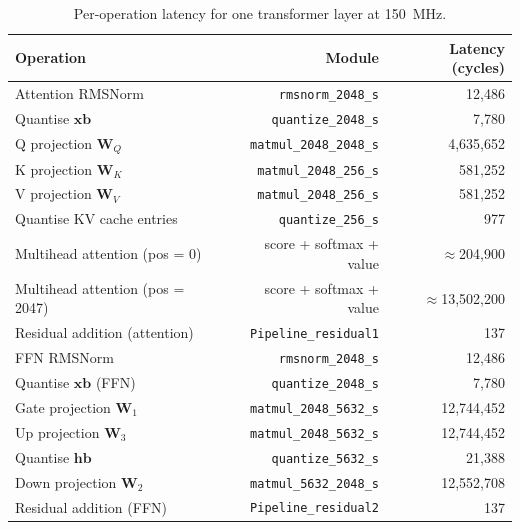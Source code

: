 \begin{table}[H]
  \centering
  \begin{tabular}{lrr}
    \toprule
    Operation & Module & Latency (cycles) \\
    \midrule
    Attention RMSNorm              & \texttt{rmsnorm\_2048\_s}      &      12{,}486 \\
    Quantise $\mathbf{xb}$         & \texttt{quantize\_2048\_s}     &       7{,}780 \\
    Q projection $\mathbf{W}_Q$    & \texttt{matmul\_2048\_2048\_s} &   4{,}635{,}652 \\
    K projection $\mathbf{W}_K$    & \texttt{matmul\_2048\_256\_s}  &     581{,}252 \\
    V projection $\mathbf{W}_V$    & \texttt{matmul\_2048\_256\_s}  &     581{,}252 \\
    Quantise KV cache entries      & \texttt{quantize\_256\_s}      &          977 \\
    Multihead attention (pos = 0)  & score + softmax + value        & $\approx$204{,}900 \\
    Multihead attention (pos = 2047) & score + softmax + value      & $\approx$13{,}502{,}200 \\
    Residual addition (attention)  & \texttt{Pipeline\_residual1}   &          137 \\
    FFN RMSNorm                    & \texttt{rmsnorm\_2048\_s}      &      12{,}486 \\
    Quantise $\mathbf{xb}$ (FFN)   & \texttt{quantize\_2048\_s}     &       7{,}780 \\
    Gate projection $\mathbf{W}_1$ & \texttt{matmul\_2048\_5632\_s} &  12{,}744{,}452 \\
    Up projection $\mathbf{W}_3$   & \texttt{matmul\_2048\_5632\_s} &  12{,}744{,}452 \\
    Quantise $\mathbf{hb}$         & \texttt{quantize\_5632\_s}     &      21{,}388 \\
    Down projection $\mathbf{W}_2$ & \texttt{matmul\_5632\_2048\_s} &  12{,}552{,}708 \\
    Residual addition (FFN)        & \texttt{Pipeline\_residual2}   &          137 \\
    \bottomrule
  \end{tabular}
  \caption{Per-operation latency for one transformer layer at
           \SI{150}{\mega\hertz}.}
  \label{tab:layer_latency}
\end{table}

